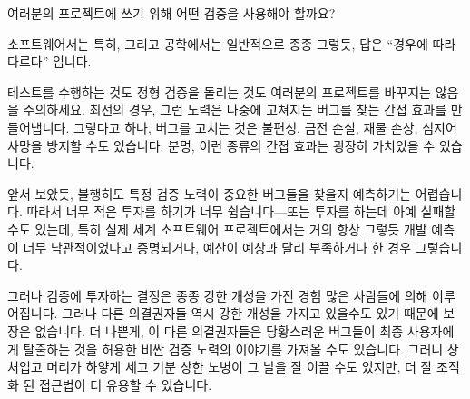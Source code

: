 여러분의 프로젝트에 쓰기 위해 어떤 검증을 사용해야 할까요?

소프트웨어서는 특히, 그리고 공학에서는 일반적으로 종종 그렇듯, 답은 ``경우에
따라 다르다'' 입니다.

테스트를 수행하는 것도 정형 검증을 돌리는 것도 여러분의 프로젝트를 바꾸지는
않음을 주의하세요.
최선의 경우, 그런 노력은 나중에 고쳐지는 버그를 찾는 간접 효과를 만들어냅니다.
그렇다고 하나, 버그를 고치는 것은 불편성, 금전 손실, 재물 손상, 심지어 사망을
방지할 수도 있습니다.
분명, 이런 종류의 간접 효과는 굉장히 가치있을 수 있습니다.

앞서 보았듯, 불행히도 특정 검증 노력이 중요한 버그들을 찾을지 예측하기는
어렵습니다.
따라서 너무 적은 투자를 하기가 너무 쉽습니다---또는 투자를 하는데 아예 실패할
수도 있는데, 특히 실제 세계 소프트웨어 프로젝트에서는 거의 항상 그렇듯 개발
예측이 너무 낙관적이었다고 증명되거나, 예산이 예상과 달리 부족하거나 한 경우
그렇습니다.

\iffalse

What sort of validation should you use for your project?

As is often the case in software in particular and in engineering
in general, the answer is ``it depends''.

Note that neither running a test nor undertaking formal verification
will change your project.
At best, such effort have an indirect effect by locating a bug that
is later fixed.
Nevertheless, fixing a bug might prevent inconvenience, monetary loss,
property damage, or even loss of life.
Clearly, this sort of indirect effect can be extremely valuable.

Unfortunately, as we have seen, it is difficult to predict whether or
not a given validation effort will find important bugs.
It is therefore all too easy to invest too little---or even to fail
to invest at all, especially if development estimates proved overly
optimistic or budgets unexpectedly tight, conditions which almost
always come into play in real-world software projects.

\fi

그러나 검증에 투자하는 결정은 종종 강한 개성을 가진 경험 많은 사람들에 의해
이루어집니다.
그러나 다른 의결권자들 역시 강한 개성을 가지고 있을수도 있기 때문에 보장은
없습니다.
더 나쁜게, 이 다른 의결권자들은 당황스러운 버그들이 최종 사용자에게 탈출하는
것을 허용한 비싼 검증 노력의 이야기를 가져올 수도 있습니다.
그러니 상처입고 머리가 하얗게 세고 기분 상한 노병이 그 날을 잘 이끌 수도
있지만, 더 잘 조직화 된 접근법이 더 유용할 수 있습니다.

